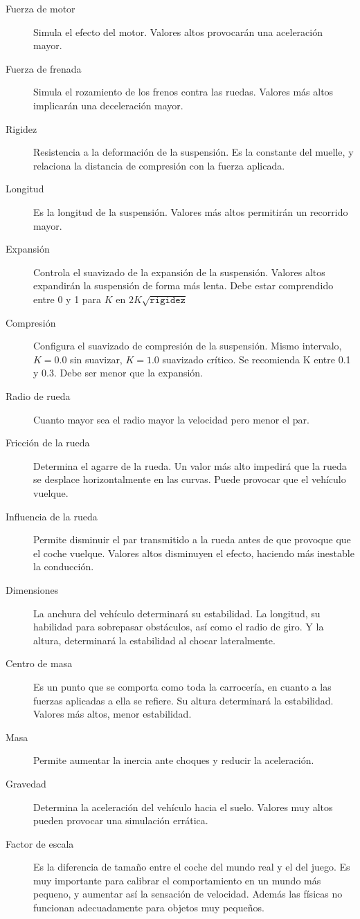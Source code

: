 \documentclass[11pt,a4paper,hidelinks]{article}
\begin{document}
\begin{description}
	\item[Fuerza de motor] Simula el efecto del motor. Valores altos 
	provocarán una aceleración mayor.
	\item[Fuerza de frenada] Simula el rozamiento de los frenos contra las 
	ruedas. Valores más altos implicarán una deceleración mayor.
	\item[Rigidez] Resistencia a la deformación de la suspensión. Es la 
	constante del muelle, y relaciona la distancia de compresión con la 
	fuerza aplicada.
	\item[Longitud] Es la longitud de la suspensión. Valores más altos 
	permitirán un recorrido mayor.
	\item[Expansión] Controla el suavizado de la expansión de la suspensión.  
	Valores altos expandirán la suspensión de forma más lenta.
	Debe estar comprendido entre 0 y 1 para $K$ en 
	$2K\sqrt{\texttt{rigidez}}$
	\item[Compresión] Configura el suavizado de compresión de la suspensión.  
	Mismo intervalo, $K = 0.0$ sin suavizar, $K = 1.0$ suavizado crítico. Se 
	recomienda K entre 0.1 y 0.3. Debe ser menor que la expansión.
	
	\item[Radio de rueda] Cuanto mayor sea el radio mayor la velocidad pero 
	menor el par.
	\item[Fricción de la rueda] Determina el agarre de la rueda. Un valor 
	más alto impedirá que la rueda se desplace horizontalmente en las 
	curvas. Puede provocar que el vehículo vuelque.
	\item[Influencia de la rueda] Permite disminuir el par transmitido a la 
	rueda antes de que provoque que el coche vuelque. Valores altos 
	disminuyen el efecto, haciendo más inestable la conducción.
	\item[Dimensiones] La anchura del vehículo determinará su estabilidad.  
	La longitud, su habilidad para sobrepasar obstáculos, así como el radio 
	de giro. Y la altura, determinará la estabilidad al chocar lateralmente.
	\item[Centro de masa] Es un punto que se comporta como toda la 
	carrocería, en cuanto a las fuerzas aplicadas a ella se refiere. Su 
	altura determinará la estabilidad. Valores más altos, menor estabilidad.
	\item[Masa] Permite aumentar la inercia ante choques y reducir la 
	aceleración.
	\item[Gravedad] Determina la aceleración del vehículo hacia el suelo.  
	Valores muy altos pueden provocar una simulación errática.
	\item[Factor de escala] Es la diferencia de tamaño entre el coche del 
	mundo real y el del juego. Es muy importante para calibrar el 
	comportamiento en un mundo más pequeno, y aumentar así la sensación de 
	velocidad.  Además las físicas no funcionan adecuadamente para objetos 
	muy pequeños.
\end{description}
\end{document}
